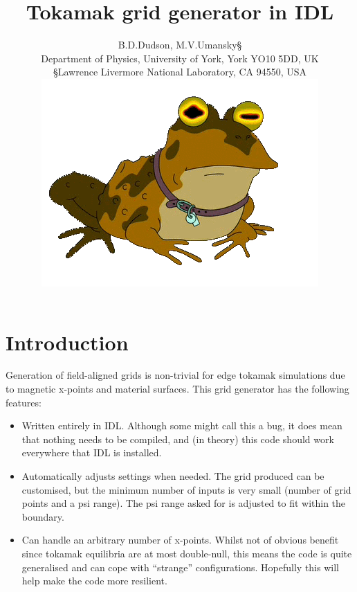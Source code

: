 \documentclass[12pt, a4paper]{article}
\begin{document}
\title{Tokamak grid generator in IDL}
\author{B.D.Dudson\dag, M.V.Umansky\S \\
\dag Department of Physics, University of York, York YO10 5DD, UK \\
\S Lawrence Livermore National Laboratory, CA 94550, USA\\
\includegraphics[width=0.2\paperwidth, keepaspectratio]{hypnotoad.png}}

\maketitle

\tableofcontents

\section{Introduction}

Generation of field-aligned grids is non-trivial for edge tokamak simulations
due to magnetic x-points and material surfaces. This grid generator has 
the following features:
\begin{itemize}
  \item Written entirely in IDL. Although some might call this a bug, it does mean that nothing needs to be compiled, and (in theory) this code should work everywhere that IDL is installed.
  \item Automatically adjusts settings when needed. The grid produced can 
    be customised, but the minimum number of inputs is very small
    (number of grid points and a psi range). The psi range asked for is
    adjusted to fit within the boundary.
  \item Can handle an arbitrary number of x-points. Whilst not of obvious
    benefit since tokamak equilibria are at most double-null, this means the
    code is quite generalised and can cope with ``strange'' configurations.
    Hopefully this will help make the code more resilient.
\end{itemize}
\end{document}
